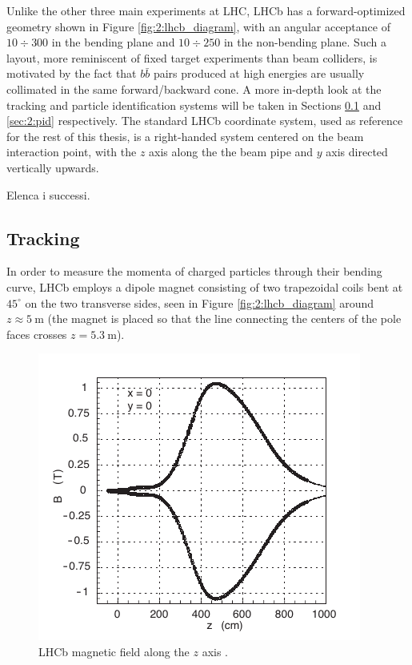 Unlike the other three main experiments at LHC, LHCb has a forward-optimized geometry shown in Figure \ref{fig:2:lhcb_diagram}, with an angular acceptance of $10\div300$ \si{\mrad} in the bending plane and $10\div250$ \si{\mrad} in the non-bending plane.
Such a layout, more reminiscent of fixed target experiments than beam colliders, is motivated by the fact that $b\bar{b}$ pairs produced at high energies are usually collimated in the same forward/backward cone.
A more in-depth look at the tracking and particle identification systems will be taken in Sections \ref{sec:2:tracking} and \ref{sec:2:pid} respectively.
\label{info:LHCb_system}
The standard LHCb coordinate system, used as reference for the rest of this thesis, is a right-handed system centered on the beam interaction point, with the $z$ axis along the the beam pipe and $y$ axis directed vertically upwards.

Elenca i successi.

\subsection{Tracking}
\label{sec:2:tracking}
In order to measure the momenta of charged particles through their bending curve, LHCb employs a dipole magnet \cite{Amato:424338} consisting of two trapezoidal coils bent at $45^\circ$ on the two transverse sides, seen in Figure \ref{fig:2:lhcb_diagram} around $z\approx \SI{5}{\meter}$ (the magnet is placed so that the line connecting the centers of the pole faces crosses $z=\SI{5.3}{\meter}$).

\begin{figure}[t]
	\centering
	\includegraphics[width=.6\textwidth]{graphics/02-lhcb/b_field_map_z.png}
	\caption[LHCb magnetic field along the $z$ axis.]{LHCb magnetic field along the $z$ axis \cite{Amato:424338}.}
	\label{fig:2:b_field_map_z}
\end{figure}

